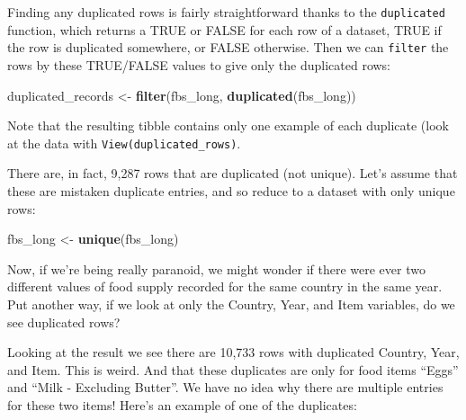 \documentclass[]{book}
\newenvironment{Shaded}{\begin{snugshade}}{\end{snugshade}}
\newcommand{\KeywordTok}[1]{\textcolor[rgb]{0.13,0.29,0.53}{\textbf{#1}}}
\newcommand{\NormalTok}[1]{#1}
\newcommand{\OperatorTok}[1]{\textcolor[rgb]{0.81,0.36,0.00}{\textbf{#1}}}
\newcommand{\StringTok}[1]{\textcolor[rgb]{0.31,0.60,0.02}{#1}}
\begin{document}
Finding any duplicated rows is fairly straightforward thanks to the \texttt{duplicated} function, which returns a TRUE or FALSE for each row of a dataset, TRUE if the row is duplicated somewhere, or FALSE otherwise. Then we can \texttt{filter} the rows by these TRUE/FALSE values to give only the duplicated rows:

\begin{Shaded}
\begin{Highlighting}[]
\NormalTok{duplicated_records <-}\StringTok{ }\KeywordTok{filter}\NormalTok{(fbs_long, }\KeywordTok{duplicated}\NormalTok{(fbs_long))}
\end{Highlighting}
\end{Shaded}

Note that the resulting tibble contains only one example of each duplicate (look at the data with \texttt{View(duplicated\_rows)}.

There are, in fact, 9,287 rows that are duplicated (not unique). Let's assume that these are mistaken duplicate entries, and so reduce to a dataset with only unique rows:

\begin{Shaded}
\begin{Highlighting}[]
\NormalTok{fbs_long <-}\StringTok{ }\KeywordTok{unique}\NormalTok{(fbs_long)}
\end{Highlighting}
\end{Shaded}

Now, if we're being really paranoid, we might wonder if there were ever two different values of food supply recorded for the same country in the same year. Put another way, if we look at only the Country, Year, and Item variables, do we see duplicated rows?

\begin{Shaded}
\end{Shaded}

Looking at the result we see there are 10,733 rows with duplicated Country, Year, and Item. This is weird. And that these duplicates are only for food items ``Eggs'' and ``Milk - Excluding Butter''. We have no idea why there are multiple entries for these two items! Here's an example of one of the duplicates:
\end{document}
